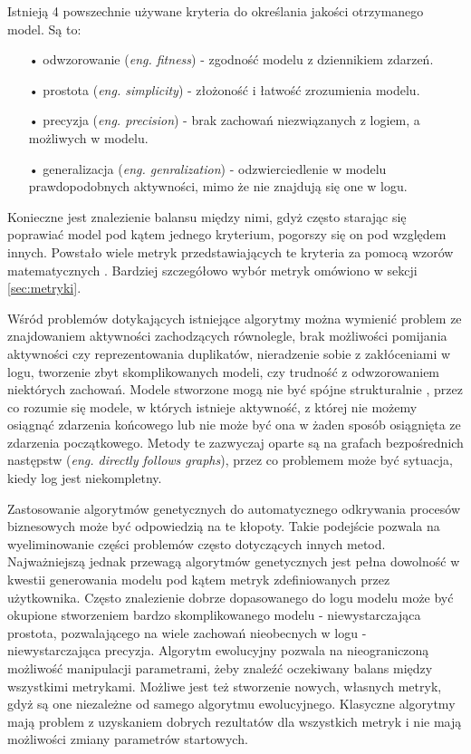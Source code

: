 Istnieją 4 powszechnie używane kryteria do określania jakości otrzymanego model. Są to:
\begin{itemize}
  \item[•] odwzorowanie (\textit{eng. fitness}) - zgodność modelu z dziennikiem zdarzeń.
  \item[•] prostota (\textit{eng. simplicity}) - złożoność i łatwość zrozumienia modelu.
  \item[•] precyzja (\textit{eng. precision}) - brak zachowań niezwiązanych z logiem, a możliwych w modelu.
  \item[•] generalizacja (\textit{eng. genralization}) - odzwierciedlenie w modelu prawdopodobnych aktywności, mimo że nie znajdują się one w logu.
\end{itemize}
Konieczne jest znalezienie balansu między nimi, gdyż często starając się poprawiać model pod kątem jednego kryterium, pogorszy się on pod względem innych. Powstało wiele metryk przedstawiających te kryteria za pomocą wzorów matematycznych \cite{conf-propositions} \cite{Blum2015MetricsIP}.
Bardziej szczegółowo wybór metryk omówiono w sekcji \ref{sec:metryki}.

Wśród problemów dotykających istniejące algorytmy można wymienić problem ze znajdowaniem aktywności zachodzących równolegle, brak możliwości pomijania aktywności czy reprezentowania duplikatów, nieradzenie sobie z zakłóceniami w logu, tworzenie zbyt skomplikowanych modeli, czy trudność z odwzorowaniem niektórych zachowań. Modele stworzone mogą nie być spójne strukturalnie \cite{dongen2006b} \cite{StructuralDetectionofDeadlocks}, przez co rozumie się modele, w których istnieje aktywność, z której nie możemy osiągnąć zdarzenia końcowego lub nie może być ona w żaden sposób osiągnięta ze zdarzenia początkowego. Metody te zazwyczaj oparte są na grafach bezpośrednich następstw (\textit{eng. directly follows graphs}), przez co problemem może być sytuacja, kiedy log jest niekompletny. 

Zastosowanie algorytmów genetycznych do automatycznego odkrywania procesów biznesowych może być odpowiedzią na te kłopoty. Takie podejście pozwala na wyeliminowanie części problemów często dotyczących innych metod. Najważniejszą jednak przewagą algorytmów genetycznych jest pełna dowolność w kwestii generowania modelu pod kątem metryk zdefiniowanych przez użytkownika. Często znalezienie dobrze dopasowanego do logu modelu może być okupione stworzeniem bardzo skomplikowanego modelu - niewystarczająca prostota, pozwalającego na wiele zachowań nieobecnych w logu - niewystarczająca precyzja. Algorytm ewolucyjny pozwala na nieograniczoną możliwość manipulacji parametrami, żeby znaleźć oczekiwany balans między wszystkimi metrykami. Możliwe jest też stworzenie nowych, własnych metryk, gdyż są one niezależne od samego algorytmu ewolucyjnego. Klasyczne algorytmy mają problem z uzyskaniem dobrych rezultatów dla wszystkich metryk i nie mają możliwości zmiany parametrów startowych.

